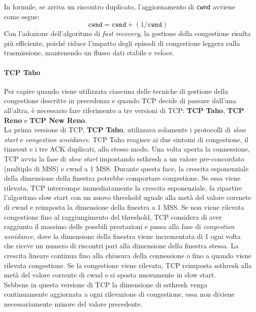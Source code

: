 \documentclass[12pt]{report}
\begin{document}
	In formule, se arriva un riscontro duplicato, l'aggiornamento di \texttt{cwnd} avviene come segue:
	\[
	\texttt{cwnd} = \texttt{cwnd} + (1 / \texttt{cwnd})
	\]
	Con l'adozione dell'algoritmo di \emph{fast recovery}, la gestione della congestione risulta più efficiente, poiché riduce l'impatto degli episodi di congestione leggera sulla trasmissione, mantenendo un flusso dati stabile e veloce.

	\paragraph{TCP Taho}
	Per capire quando viene utilizzata ciascuna delle tecniche di gestione della congestione descritte in precedenza e quando TCP decide di passare dall'una all'altra, è necessario fare riferimento a tre versioni di TCP: \textbf{TCP Taho}, \textbf{TCP Reno} e \textbf{TCP New Reno}.
	\vspace{\baselineskip}\\
	La prima versione di TCP, \textbf{TCP Taho}, utilizzava solamente i protocolli di \textit{slow start} e \textit{congestion avoidance}. TCP Taho reagisce ai due sintomi di congestione, il timeout e i tre ACK duplicati, allo stesso modo. Una volta aperta la connessione, TCP avvia la fase di \textit{slow start} impostando ssthresh a un valore pre-concordato (multiplo di MSS) e cwnd a 1 MSS. Durante questa face, la crescita esponenziale della dimensione della finestra potrebbe comportare congestione. Se essa viene rilevata, TCP interrompe immediatamente la crescita esponenziale, fa ripartire l'algoritmo slow start con un nuovo threshold uguale alla metà del valore corrnete di cwnd e reimposta la dimensione della finestra a 1 MSS. Se non viene rilevata congestione fino al raggiungimento del threshold, TCP considera di aver raggiunto il massimo delle possbili prestazioni e passa alla fase di \textit{congestion avoidance}, dove la dimensione della finestra viene incrementata di 1 ogni volta che riceve un numero di riscontri pari alla dimensione della finestra stessa. La crescita lineare continua fino alla chiusura della connessione o fino a quando viene rilevata congestione. Se la congestione viene rilevata, TCP reimposta ssthresh alla metà del valore corrente di cwnd e si sposta nuovamente in slow start.
	\vspace{\baselineskip}\\
	Sebbene in questa versione di TCP la dimensione di ssthresh venga continuamente aggiornata a ogni rilevazione di congestione, essa non diviene necessariamente minore del valore precedente.
\end{document}
